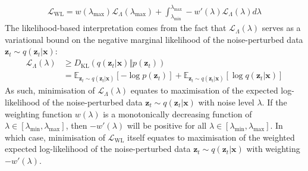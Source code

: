 \documentclass[ oneside,%
                    author={George Herbert},
                    degree={MSci},
                     title={Diffusion Models for Time-Evolving Precipitation Fields},
                  subtitle={}]{dissertation}
\begin{document}
\begin{align}
      \mathcal{L}_{\mathrm{WL}} = w(\lambda_{\max})\mathcal{L}_\Lambda(\lambda_{\max}) + \int_{\lambda_{\min}}^{\lambda_{\max}}-w'(\lambda)\mathcal{L}_\Lambda(\lambda) d\lambda
\end{align}
The likelihood-based interpretation comes from the fact that $\mathcal{L}_\Lambda(\lambda)$ serves as a variational bound on the negative marginal likelihood of the noise-perturbed data $\mathbf{z}_t\sim q(\mathbf{z}_t|\mathbf{x})$:
\begin{align}
      \mathcal{L}_\Lambda(\lambda)&\ge D_{\mathrm{KL}}(q(\mathbf{z}_t|\mathbf{x})\Vert p(\mathbf{z}_t))\\
      &=\mathbb{E}_{\mathbf{z}_t\sim q(\mathbf{z}_t|\mathbf{x})}\left[-\log p(\mathbf{z}_t)\right]+\mathbb{E}_{\mathbf{z}_t\sim q(\mathbf{z}_t|\mathbf{x})}\left[\log q(\mathbf{z}_t|\mathbf{x})\right]
\end{align}
As such, minimisation of $\mathcal{L}_\Lambda(\lambda)$ equates to maximisation of the expected log-likelihood of the noise-perturbed data $\mathbf{z}_t\sim q(\mathbf{z}_t|\mathbf{x})$ with noise level $\lambda$. If the weighting function $w(\lambda)$ is a monotonically decreasing function of $\lambda\in [\lambda_{\min}, \lambda_{\max}]$, then $-w'(\lambda)$ will be positive for all $\lambda\in [\lambda_{\min}, \lambda_{\max}]$. In which case, minimisation of $\mathcal{L}_{\mathrm{WL}}$ itself equates to maximisation of the weighted expected log-likelihood of the noise-perturbed data $\mathbf{z}_t\sim q(\mathbf{z}_t|\mathbf{x})$ with weighting $-w'(\lambda)$. 
\end{document}
